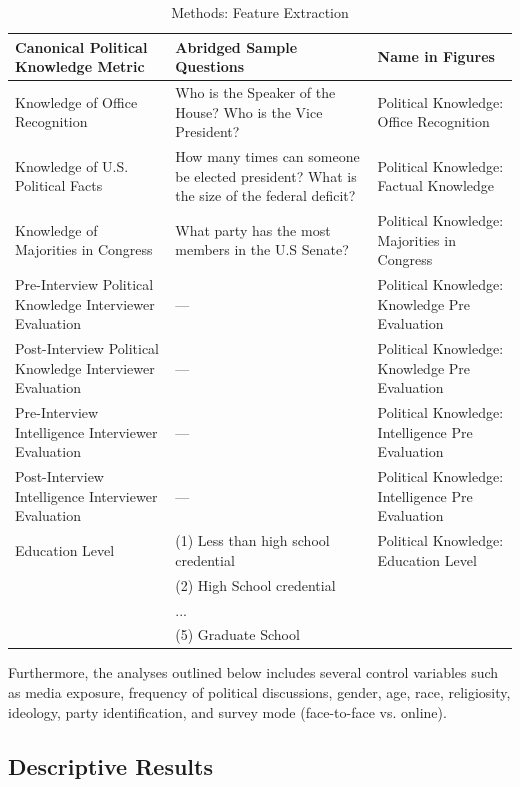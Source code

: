 \documentclass[12pt]{article}
\begin{document}
\begin{table}[h]\onehalfspacing\footnotesize
\begin{tabularx}{\textwidth}{XXX}
\hline
Canonical Political Knowledge Metric &	Abridged Sample Questions &	Name in Figures \\
\hline
Knowledge of Office Recognition  	  & Who is the Speaker of the House? Who is the Vice President? &  Political Knowledge: Office Recognition \\ 
Knowledge of U.S. Political Facts 	 & How many times can someone be elected president? What is the size of the federal deficit? & Political Knowledge: Factual Knowledge\\
Knowledge of Majorities in Congress & What party has the most members in the U.S Senate? & Political Knowledge: Majorities in Congress\\
Pre-Interview Political Knowledge Interviewer Evaluation & --- & Political Knowledge: Knowledge Pre Evaluation\\
Post-Interview Political Knowledge Interviewer Evaluation & --- & Political Knowledge: Knowledge Pre Evaluation\\
Pre-Interview Intelligence Interviewer Evaluation & --- & Political Knowledge: Intelligence Pre Evaluation\\
Post-Interview Intelligence Interviewer Evaluation & --- & Political Knowledge: Intelligence Pre Evaluation\\
Education Level 	 & (1) Less than high school credential&Political Knowledge: Education Level \\
&(2) High School credential&\\
&...&\\
&(5) Graduate School & \\
\hline 
\end{tabularx} 
\caption{Methods: Feature Extraction}\label{tab:featextr}
\end{table}

Furthermore, the analyses outlined below includes several control variables such as media exposure, frequency of political discussions, gender, age, race, religiosity, ideology, party identification, and survey mode (face-to-face vs. online).
	

\subsection{Descriptive Results}
\end{document}
